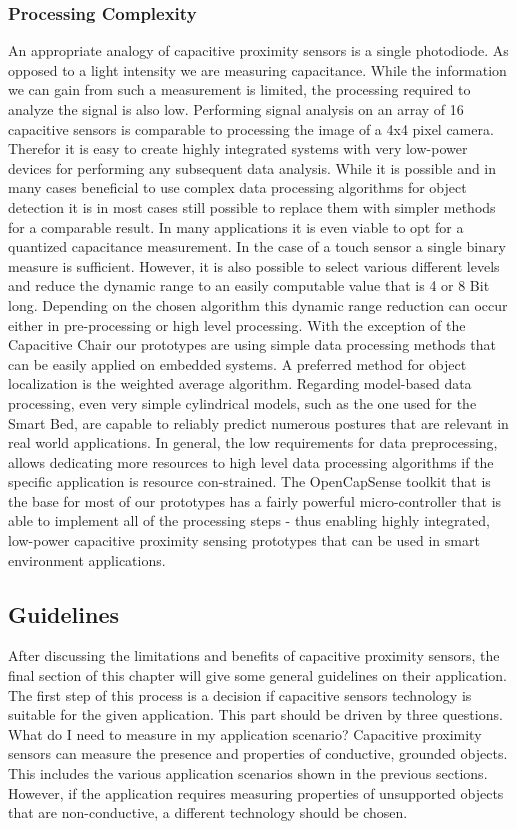\subsubsection{Processing Complexity}
An appropriate analogy of capacitive proximity sensors is a single photodiode. As opposed to a light intensity we are measuring capacitance. While the information we can gain from such a measurement is limited, the processing required to analyze the signal is also low. Performing signal analysis on an array of 16 capacitive sensors is comparable to processing the image of a 4x4 pixel camera. Therefor it is easy to create highly integrated systems with very low-power devices for performing any subsequent data analysis. While it is possible and in many cases beneficial to use complex data processing algorithms for object detection it is in most cases still possible to replace them with simpler methods for a comparable result.
In many applications it is even viable to opt for a quantized capacitance measurement. In the case of a touch sensor a single binary measure is sufficient. However, it is also possible to select various different levels and reduce the dynamic range to an easily computable value that is 4 or 8 Bit long. Depending on the chosen algorithm this dynamic range reduction can occur either in pre-processing or high level processing.
With the exception of the Capacitive Chair our prototypes are using simple data processing methods that can be easily applied on embedded systems. A preferred method for object localization is the weighted average algorithm. Regarding model-based data processing, even very simple cylindrical models, such as the one used for the Smart Bed, are capable to reliably predict numerous postures that are relevant in real world applications. In general, the low requirements for data preprocessing, allows dedicating more resources to high level data processing algorithms if the specific application is resource con-strained. 
The OpenCapSense toolkit that is the base for most of our prototypes has a fairly powerful micro-controller that is able to implement all of the processing steps - thus enabling highly integrated, low-power capacitive proximity sensing prototypes that can be used in smart environment applications.
\subsection{Guidelines}
After discussing the limitations and benefits of capacitive proximity sensors, the final section of this chapter will give some general guidelines on their application. The first step of this process is a decision if capacitive sensors technology is suitable for the given application. This part should be driven by three questions.
What do I need to measure in my application scenario?
Capacitive proximity sensors can measure the presence and properties of conductive, grounded objects. This includes the various application scenarios shown in the previous sections. However, if the application requires measuring properties of unsupported objects that are non-conductive, a different technology should be chosen.



